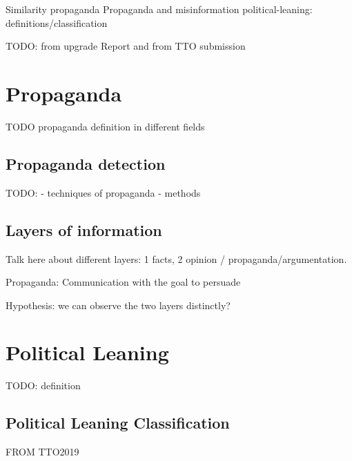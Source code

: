 Similarity
\gls{propaganda}
Propaganda and misinformation
\Gls{political-leaning}: definitions/classification


TODO: from upgrade Report and from TTO submission

\section{Propaganda}
\label{sec:lit_propaganda}

TODO propaganda definition in different fields

\subsection{Propaganda detection}
\label{ssec:lit_propaganda_detection}

TODO: 
- techniques of propaganda
- methods

\subsection{Layers of information}
\label{ssec:lit_layers_of_info}

Talk here about different layers: 1 facts, 2 opinion / propaganda/argumentation.

Propaganda: Communication with the goal to persuade

Hypothesis: we can observe the two layers distinctly?

\section{Political Leaning}
\label{sec:lit_leaning}

TODO: definition

\subsection{Political Leaning Classification}
\label{ssec:lit_leaning_classification}

FROM TTO2019



